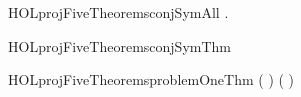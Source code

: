 \newcommand{\HOLprojFiveDate}{06 October 2017}
\newcommand{\HOLprojFiveTime}{22:01}
\begin{SaveVerbatim}{HOLprojFiveTheoremsconjSymAll}
\HOLTokenTurnstile{} \HOLSymConst{\HOLTokenForall{}} .  \HOLSymConst{\HOLTokenConj{}}  \HOLSymConst{\HOLTokenEquiv{}}  \HOLSymConst{\HOLTokenConj{}} 
\end{SaveVerbatim}
\newcommand{\HOLprojFiveTheoremsconjSymAll}{\UseVerbatim{HOLprojFiveTheoremsconjSymAll}}
\begin{SaveVerbatim}{HOLprojFiveTheoremsconjSymThm}
\HOLTokenTurnstile{}  \HOLSymConst{\HOLTokenConj{}}  \HOLSymConst{\HOLTokenEquiv{}}  \HOLSymConst{\HOLTokenConj{}} 
\end{SaveVerbatim}
\newcommand{\HOLprojFiveTheoremsconjSymThm}{\UseVerbatim{HOLprojFiveTheoremsconjSymThm}}
\begin{SaveVerbatim}{HOLprojFiveTheoremsproblemOneThm}
\HOLTokenTurnstile{}  \HOLSymConst{\HOLTokenImp{}} ( \HOLSymConst{\HOLTokenImp{}} ) \HOLSymConst{\HOLTokenImp{}} ( \HOLSymConst{\HOLTokenImp{}} ) \HOLSymConst{\HOLTokenImp{}} 
\end{SaveVerbatim}
\newcommand{\HOLprojFiveTheoremsproblemOneThm}{\UseVerbatim{HOLprojFiveTheoremsproblemOneThm}}
\newcommand{\HOLprojFiveTheorems}{
\HOLThmTag{proj5}{conjSymAll}\HOLprojFiveTheoremsconjSymAll
\HOLThmTag{proj5}{conjSymThm}\HOLprojFiveTheoremsconjSymThm
\HOLThmTag{proj5}{problem1Thm}\HOLprojFiveTheoremsproblemOneThm
}
